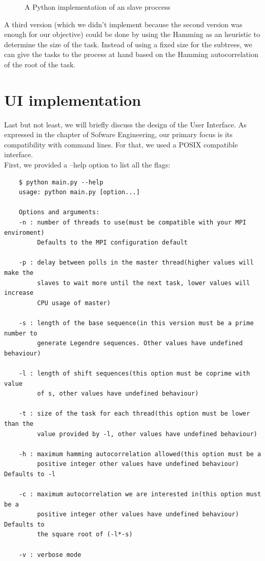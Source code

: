   \begin{figure}[ht!]
    \caption{A Python implementation of an slave proccess}
    \label{parallelism_example:fig:2}
  \end{figure}

  A third version (which we didn't implement because the second version was
  enough for our objective) could be done by using the Hamming as an
  heuristic to determine the size of the task. Instead of using a fixed size
  for the subtrees, we can give the tasks to the process at hand based on the
  Hamming autocorrelation of the root of the task.\\

  \section{UI implementation}

  Last but not least, we will briefly discuss the design of the User Interface.
  As expressed in the chapter of Sofware Engineering, our primary focus is
  its compatibility with command lines. For that, we used a POSIX compatible
  interface.\\

  First, we provided a --help option to list all the flags:
  \begin{lstlisting}
    $ python main.py --help
    usage: python main.py [option...]

    Options and arguments:
    -n : number of threads to use(must be compatible with your MPI enviroment)
         Defaults to the MPI configuration default

    -p : delay between polls in the master thread(higher values will make the
         slaves to wait more until the next task, lower values will increase
         CPU usage of master)

    -s : length of the base sequence(in this version must be a prime number to
         generate Legendre sequences. Other values have undefined behaviour)

    -l : length of shift sequences(this option must be coprime with value
         of s, other values have undefined behaviour)

    -t : size of the task for each thread(this option must be lower than the
         value provided by -l, other values have undefined behaviour)

    -h : maximum hamming autocorrelation allowed(this option must be a
         positive integer other values have undefined behaviour) Defaults to -l

    -c : maximum autocorrelation we are interested in(this option must be a
         positive integer other values have undefined behaviour) Defaults to
         the square root of (-l*-s)

    -v : verbose mode
  \end{lstlisting}

